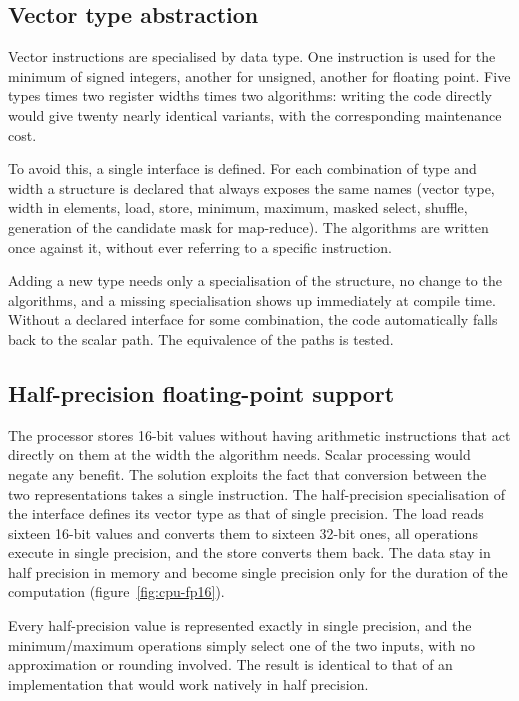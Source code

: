 \subsection{Vector type abstraction}
\label{sec:cpu-simd-traits}

Vector instructions are specialised by data type. One instruction is used for
the minimum of signed integers, another for unsigned, another for floating
point. Five types times two register widths times two algorithms: writing the
code directly would give twenty nearly identical variants, with the
corresponding maintenance cost.

To avoid this, a single interface is defined. For each combination of type and
width a structure is declared that always exposes the same names (vector type,
width in elements, load, store, minimum, maximum, masked select, shuffle,
generation of the candidate mask for map-reduce). The algorithms are written
once against it, without ever referring to a specific instruction.

Adding a new type needs only a specialisation of the structure, no change to
the algorithms, and a missing specialisation shows up immediately at compile
time. Without a declared interface for some combination, the code automatically
falls back to the scalar path. The equivalence of the paths is tested.

\subsection{Half-precision floating-point support}
\label{sec:cpu-fp16}

The processor stores 16-bit values without having arithmetic instructions that
act directly on them at the width the algorithm needs. Scalar processing would
negate any benefit. The solution exploits the fact that conversion between the
two representations takes a single instruction. The half-precision
specialisation of the interface defines its vector type as that of single
precision. The load reads sixteen 16-bit values and converts them to sixteen
32-bit ones, all operations execute in single precision, and the store converts
them back. The data stay in half precision in memory and become single
precision only for the duration of the computation (figure~\ref{fig:cpu-fp16}).



Every half-precision value is represented exactly in single precision, and the
minimum/maximum operations simply select one of the two inputs, with no
approximation or rounding involved. The result is identical to that of an
implementation that would work natively in half precision.

